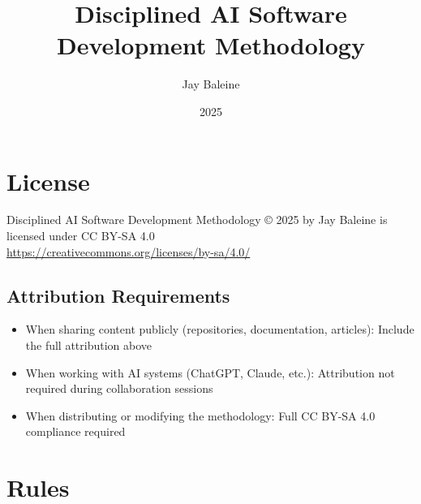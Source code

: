 \documentclass{article}
\title{Disciplined AI Software Development Methodology}
\author{Jay Baleine}
\date{2025}
\begin{document}
\maketitle

\section*{License}
Disciplined AI Software Development Methodology © 2025 by Jay Baleine is licensed under CC BY-SA 4.0 \\
\url{https://creativecommons.org/licenses/by-sa/4.0/}

\subsection*{Attribution Requirements}
\begin{itemize}[noitemsep]
\item When sharing content publicly (repositories, documentation, articles): Include the full attribution above
\item When working with AI systems (ChatGPT, Claude, etc.): Attribution not required during collaboration sessions
\item When distributing or modifying the methodology: Full CC BY-SA 4.0 compliance required
\end{itemize}

\section{Rules}
\end{document}
